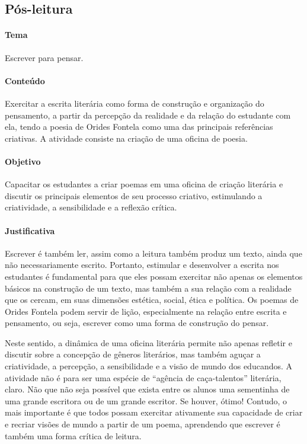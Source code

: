 \documentclass[12pt]{extarticle}
\begin{document}
\subsection{Pós-leitura}

\paragraph{Tema} Escrever para pensar.

\paragraph{Conteúdo} Exercitar a escrita literária como forma de
construção e organização do pensamento, a partir da percepção da
realidade e da relação do estudante com ela, tendo a poesia de Orides
Fontela como uma das principais referências criativas. A atividade
consiste na criação de uma oficina de poesia.

\paragraph{Objetivo} Capacitar os estudantes a criar poemas em uma oficina
de criação literária e discutir os principais elementos de seu processo
criativo, estimulando a criatividade, a sensibilidade e a reflexão
crítica.

\paragraph{Justificativa} Escrever é também ler, assim como a leitura
também produz um texto, ainda que não necessariamente escrito. Portanto,
estimular e desenvolver a escrita nos estudantes é fundamental para que
eles possam exercitar não apenas os elementos básicos na construção de
um texto, mas também a sua relação com a realidade que os cercam, em
suas dimensões estética, social, ética e política. Os poemas de Orides
Fontela podem servir de lição, especialmente na relação entre escrita e
pensamento, ou seja, escrever como uma forma de construção do pensar.

Neste sentido, a dinâmica de uma oficina literária permite não apenas
refletir e discutir sobre a concepção de gêneros literários, mas também
aguçar a criatividade, a percepção, a sensibilidade e a visão de mundo
dos educandos. A atividade não é para ser uma espécie de ``agência de
caça-talentos'' literária, claro. Não que não seja possível que exista
entre os alunos uma sementinha de uma grande escritora ou de um grande
escritor. Se houver, ótimo! Contudo, o mais importante é que todos
possam exercitar ativamente sua capacidade de criar e recriar visões de
mundo a partir de um poema, aprendendo que escrever é também uma forma
crítica de leitura.
\end{document}
